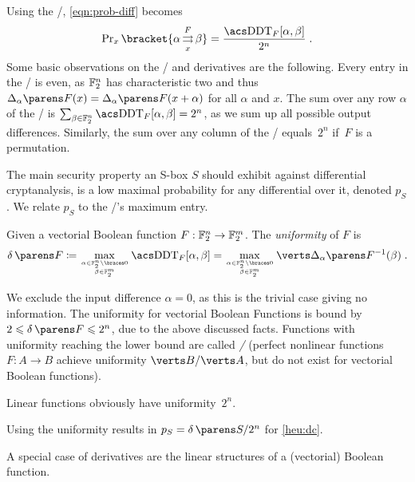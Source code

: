 Using the \DDT/, \cref{eqn:prob-diff} becomes
\begin{equation*}
    \Prob_x\bracket{\propDiff{\alpha}{F}{x}{\beta}} = \frac{\text{\DDTs/}_F[\alpha, \beta]}{2^n}\;.
\end{equation*}
Some basic observations on the \DDT/ and derivatives are the following.
Every entry in the \DDT/ is even, as $\mathbb{F}_2^n$ has characteristic two and thus $\derive{\alpha}{F}(x) = \derive{\alpha}{F}(x+\alpha)$ for all $\alpha$ and $x$.
The sum over any row $\alpha$ of the \DDT/ is $\sum_{\beta \in \F_2^n} \text{\DDTs/}_F[\alpha, \beta] = 2^n$, as we sum up all possible output differences.
Similarly, the sum over any column of the \DDT/ equals~$2^n$ if~$F$ is a permutation.

The main security property an S-box $S$ should exhibit against differential cryptanalysis, is a low maximal probability for any differential over it, denoted $p_S$.
We relate $p_S$ to the \DDT/'s maximum entry.
\begin{definition}[Uniformity]
    Given a vectorial Boolean function $F : \mathbb{F}_2^n \to \mathbb{F}_2^m$.
    The \emph{uniformity} of $F$ is
    \begin{equation*}
        \uniformity{F} \coloneqq \max_{\tower{\alpha \in \F_2^n \setminus \set{0}}{\beta \in \F_2^m}} \text{\DDTs/}_F[\alpha, \beta] = \max_{\tower{\alpha \in \F_2^n \setminus \set{0}}{\beta \in \F_2^m}} \abs{\derive{\alpha}{F}^{-1}(\beta)}\;.
    \end{equation*}
\end{definition}
We exclude the input difference $\alpha = 0$, as this is the trivial case giving no information.
The uniformity for vectorial Boolean Functions is bound by $2 \leqslant \uniformity{F} \leqslant 2^n$, due to the above discussed facts.
Functions with uniformity reaching the lower bound are called \emph{\APN/} (perfect nonlinear functions $F : A \to B$ achieve uniformity $\abs{B}/\abs{A}$, but do not exist for vectorial Boolean functions).

Linear functions obviously have uniformity~$2^n$.

Using the uniformity results in $p_S = \uniformity{S}/2^n$ for \cref{heu:dc}.

A special case of derivatives are the linear structures of a (vectorial) Boolean function.

